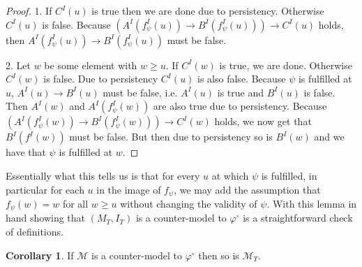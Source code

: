 \documentclass[a4paper,12pt]{report}
\theoremstyle{definition}
\theoremstyle{definition}
\newtheorem{corollary}[theorem]{Corollary}
\theoremstyle{definition}
\theoremstyle{definition}
\theoremstyle{definition}
\theoremstyle{definition}
\theoremstyle{definition}
\begin{document}
	\begin{proof}
		1. If $C^I(u)$ is true then we are done due to persistency. Otherwise $C^I(u)$ is false.
		Because $(A^I(f_\psi^I(u))\to B^I(f_\psi^I(u)))\to C^I(u)$ holds, then $A^I(f_\psi^I(u))\to B^I(f_\psi^I(u))$ must be false.
		
		
		2. Let $w$ be some element with $w\geq u$.
		If $C^I(w)$ is true, we are done.
		Otherwise $C^I(w)$ is false.
		Due to persistency $C^I(u)$ is also false.
		Because $\psi$ is fulfilled at $u$, $A^I(u)\to B^I(u)$ must be false, i.e. $A^I(u)$ is true and $B^I(u)$ is false. Then $A^I(w)$ and $A^I(f^I_\psi(w))$ are also true due to persistency.
		Because $(A^I(f^I_\psi(w))\to B^I(f^I_\psi(w)))\to C^I(w)$ holds, we now get that  $B^I(f^I(w))$ must be false.
		But then due to persistency so is $B^I(w)$ and we have that $\psi$ is fulfilled at $w$.
	\end{proof}

	Essentially what this tells us is that for every $u$ at which $\psi$ is fulfilled, in particular for each $u$ in the image of $f_\psi$, we may add the assumption that $f_\psi(w) = w$ for all $w\geq u$ without changing the validity of $\psi$.
	With this lemma in hand showing that $(M_T, I_T)$ is a counter-model to $\varphi^\circ$ is a straightforward check of definitions.
	
	\begin{corollary}
		If $\mathcal M$ is a counter-model to $\varphi^\circ$ then so is $\mathcal M_T$.
	\end{corollary}
	
\end{document}

